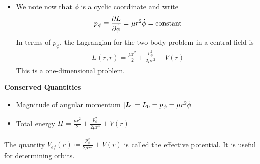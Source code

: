 \documentclass[11pt, a4paper]{article}
\begin{document}
\begin{itemize}
	\item We note now that $ \phi $ is a cyclic coordinate and write
	\begin{align*}
		p_{\phi} \equiv \pdv{L}{\dot \phi} = \mu r^2 \dot \phi = \text{constant}
	\end{align*}
	In terms of $ p_{\phi} $, the Lagrangian for the two-body problem in a central field is
	\begin{align*}
		L(r, \dot{r}) = \frac{\mu \dot{r}^2}{2} + \frac{p_{\phi}^2}{2 \mu r^2} - V(r)
	\end{align*}
	This is a one-dimensional problem.
\end{itemize}

\textbf{Conserved Quantities}
\begin{itemize}
	\item Magnitude of angular momentum $ \abs{\bm{L}} = L_0 = p_{\phi} = \mu r^2 \dot{\phi} $
	
	\item Total energy $ H = \frac{\mu \dot{r}^2}{2} + \frac{p_{\phi}^2}{2 \mu r^2} + V(r) $
\end{itemize}

The quantity $ V_{ef}(r) \coloneqq \frac{p_{\phi}^2}{2 \mu r^2} + V(r)$ is called the effective potential. It is useful for determining orbits.
\end{document}

